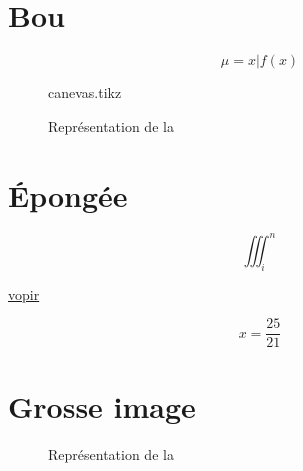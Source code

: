 \chaptertoc{}

\section{Bou}

\blindtext

\begin{equation}
\label{eq:mu}
\mu = {x|f(x)}
\end{equation}

\begin{figure}
  \begin{center}
  {canevas.tikz}
  \end{center}
  \caption{Représentation de la}
  \label{fig:1}
\end{figure}

\section{Épongée}

\begin{equation}
∭_i^n
\end{equation}

\blindtext

\hyperref[eq:mu]{vopir}

\begin{equation}
	\label{eq:1}
	x = \frac{25}{21}
\end{equation}

\section{Grosse image}

\blindtext

\begin{figure}
  \begin{center}
  \end{center}
  \caption{Représentation de la}
  \label{fig:2}
 \end{figure}

\blindtext